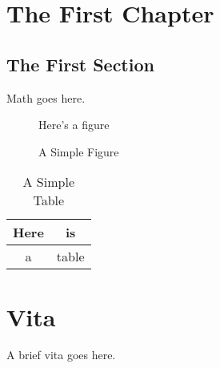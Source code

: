 \documentclass[final]{ukthesis}
\begin{document}
\chapter{The First Chapter}
\section{The First Section}
Math goes here.
\begin{figure}[h]
\centering
Here's a figure
\caption{A Simple Figure}
\end{figure}
\begin{table}[h]
\centering
\begin{tabular}{c|c}
Here & is \\
\hline
a & table
\end{tabular}
\caption{A Simple Table}
\end{table}
\copyrightnotice
\backmatter

\chapter{Vita}
A brief vita goes here.
\end{document}
